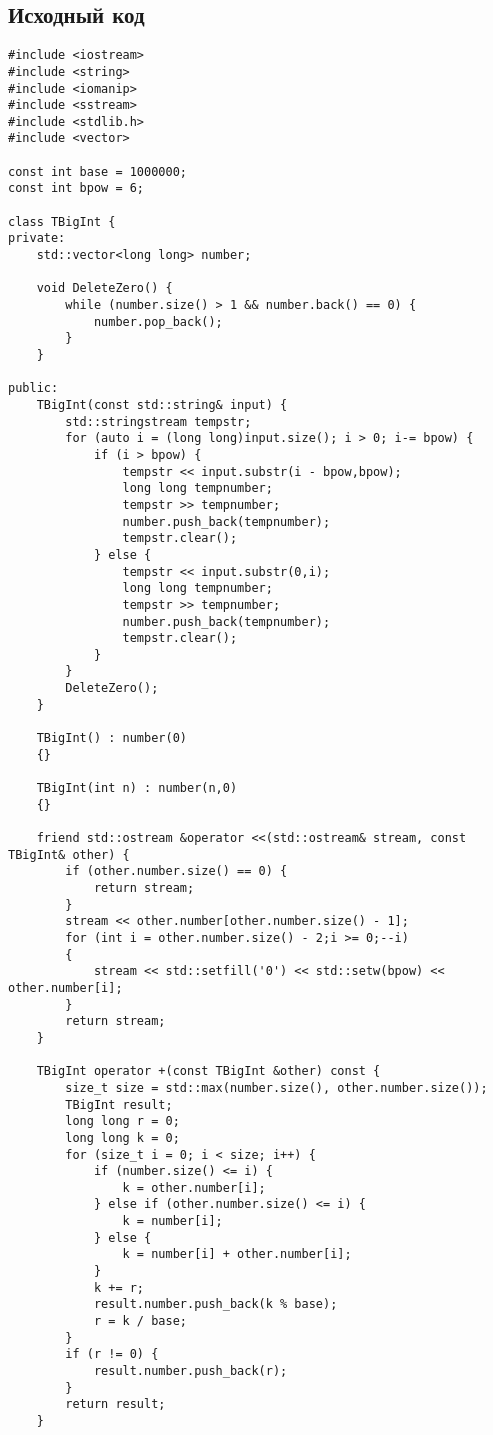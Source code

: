 \documentclass[12pt]{article}
\begin{document}
\subsection*{Исходный код}

\begin{verbatim}
#include <iostream>
#include <string>
#include <iomanip>
#include <sstream>
#include <stdlib.h>
#include <vector>

const int base = 1000000;
const int bpow = 6;

class TBigInt {
private:
    std::vector<long long> number;

    void DeleteZero() {
        while (number.size() > 1 && number.back() == 0) {
            number.pop_back();
        }
    }

public:
    TBigInt(const std::string& input) {
        std::stringstream tempstr;
        for (auto i = (long long)input.size(); i > 0; i-= bpow) {
            if (i > bpow) {
                tempstr << input.substr(i - bpow,bpow);
                long long tempnumber;
                tempstr >> tempnumber;
                number.push_back(tempnumber);
                tempstr.clear();
            } else {
                tempstr << input.substr(0,i); 
                long long tempnumber;
                tempstr >> tempnumber;
                number.push_back(tempnumber);
                tempstr.clear();
            }
        }
        DeleteZero();
    }

    TBigInt() : number(0)
    {}

    TBigInt(int n) : number(n,0)
    {}

    friend std::ostream &operator <<(std::ostream& stream, const TBigInt& other) {
        if (other.number.size() == 0) {
            return stream;
        }
        stream << other.number[other.number.size() - 1];
        for (int i = other.number.size() - 2;i >= 0;--i)
        {
            stream << std::setfill('0') << std::setw(bpow) << other.number[i];
        }
        return stream;
    }

    TBigInt operator +(const TBigInt &other) const {
        size_t size = std::max(number.size(), other.number.size());
        TBigInt result;
        long long r = 0;
        long long k = 0;
        for (size_t i = 0; i < size; i++) {
            if (number.size() <= i) {
                k = other.number[i];
            } else if (other.number.size() <= i) {
                k = number[i];
            } else {
                k = number[i] + other.number[i];
            }
            k += r;
            result.number.push_back(k % base);
            r = k / base;   
        }
        if (r != 0) {
            result.number.push_back(r);
        }
        return result;
    } 


\end{verbatim}
\end{document}
